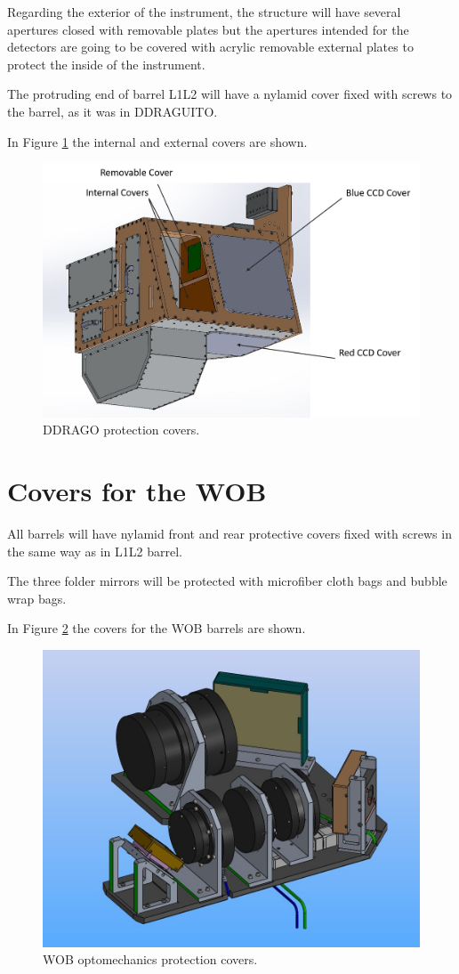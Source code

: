 \documentclass{report}
\begin{document}
Regarding the exterior of the instrument, the structure will have several apertures closed with removable plates but the apertures intended for the detectors are going to be covered with acrylic removable external plates to protect the inside of the instrument.

The protruding end of barrel L1L2 will have a nylamid cover fixed with screws to the barrel, as it was in DDRAGUITO.

In Figure \ref{figure:DD-Covers} the internal and external covers are shown.

\begin{figure}
\centering
\includegraphics[width=0.8\linewidth]{figures/Covers.png}
\caption{DDRAGO protection covers.}
\label{figure:DD-Covers}
\end{figure}

\section{Covers for the WOB}

All barrels will have nylamid front and rear protective covers fixed with screws in the same way as in L1L2 barrel.

The three folder mirrors will be protected with microfiber cloth bags and bubble wrap bags.

In Figure \ref{figure:wob-covers} the covers for the WOB barrels are shown.

\begin{figure}
\centering
\includegraphics[width=0.8\linewidth]{figures/wob-covers.jpg}
\caption{WOB optomechanics protection covers.}
\label{figure:wob-covers}
\end{figure}
\end{document}
